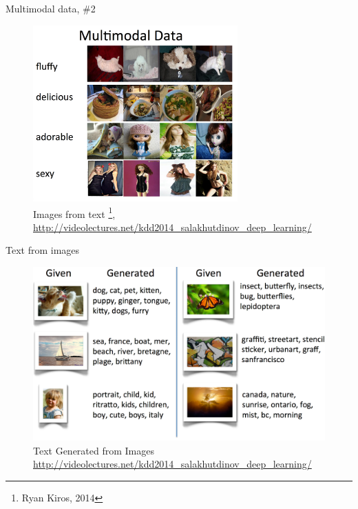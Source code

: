 \documentclass[10pt]{beamer}
\begin{document}
\begin{frame}{Multimodal data, \#2}

\begin{figure}[h!]
	\centering
	\includegraphics[width=0.7\textwidth]{images/multimodal2.png}
	\caption{Images from text \footnote{Ryan Kiros, 2014},\\ \url{http://videolectures.net/kdd2014_salakhutdinov_deep_learning/}}
\end{figure} 

\end{frame}


\begin{frame}{Text from images}

\begin{figure}[h!]
	\centering
	\includegraphics[width=1\textwidth]{images/text_generation.png}
	\caption{Text Generated from	 Images \\ \url{http://videolectures.net/kdd2014_salakhutdinov_deep_learning/}}
\end{figure} 

\end{frame}
\end{document}
